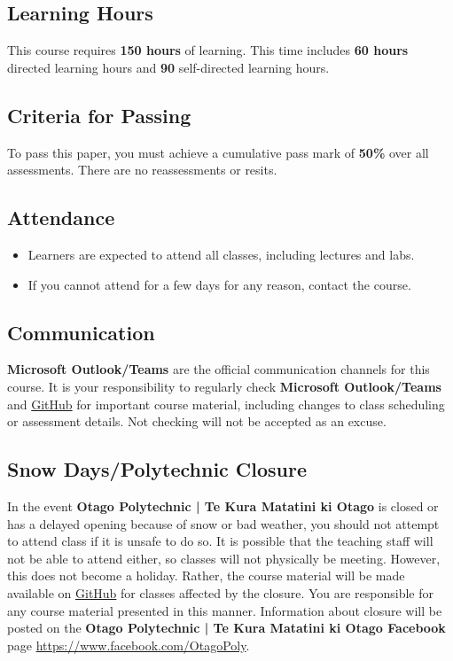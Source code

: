 \documentclass{article}
\begin{document}
\subsection*{Learning Hours}
This course requires \textbf{150 hours} of learning. This time includes \textbf{60 hours} directed learning hours and \textbf{90} self-directed learning hours.

\subsection*{Criteria for Passing}
To pass this paper, you must achieve a cumulative pass mark of \textbf{50\%} over all assessments. There are no reassessments or resits.

\subsection*{Attendance}
\begin{itemize}
	\item Learners are expected to attend all classes, including lectures and labs.
	\item If you cannot attend for a few days for any reason, contact the course.
\end{itemize}

\subsection*{Communication}
\textbf{Microsoft Outlook/Teams} are the official communication channels for this course. It is your responsibility to regularly check \textbf{Microsoft Outlook/Teams} and \href{https://github.com/otago-polytechnic-bit-courses/ID623001-introduction-to-algorithmic-problem-solving}{GitHub} for important course material, including changes to class scheduling or assessment details. Not checking will not be accepted as an excuse.

\subsection*{Snow Days/Polytechnic Closure}
In the event \textbf{Otago Polytechnic | Te Kura Matatini ki Otago} is closed or has a delayed opening because of snow or bad weather, you should not attempt to attend class if it is unsafe to do so. It is possible that the teaching staff will not be able to attend either, so classes will not physically be meeting. However, this does not become a holiday. Rather, the course material will be made available on \href{https://github.com/otago-polytechnic-bit-courses/ID623001-introduction-to-algorithmic-problem-solving}{GitHub} for classes affected by the closure. You are responsible for any course material presented in this manner. Information about closure will be posted on the \textbf{Otago Polytechnic | Te Kura Matatini ki Otago Facebook} page \href{https://www.facebook.com/OtagoPoly}{https://www.facebook.com/OtagoPoly}.
\end{document}
